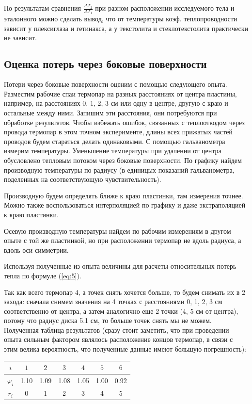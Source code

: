 \documentclass[a4paper,11.5pt]{article} %
\begin{document}
По результатам сравнения $\frac{\Delta T_2}{\Delta T_1}$ при разном расположении исследуемого тела и эталонного можно сделать вывод, что от температуры коэф. теплопроводности зависит у плексиглаза и гетинакса, а у текстолита и стеклотекстолита практически не зависит.

\subsection{Оценка потерь через боковые поверхности}
Потери через боковые поверхности оценим с помощью следующего опыта. Разместим рабочие спаи термопар на разных расстояниях от центра пластины, например, на расстояниях 0, 1, 2, 3 см или одну в центре, другую с краю и остальные между ними. Запишим эти расстояния, они потребуются при обработке результатов. Чтобы избежать ошибок, связанных с теплоотводом через провода термопар в этом точном эксперименте, длины всех прижатых частей проводов будем стараться делать одинаковыми. С помощью гальванометра измерим температуры. Уменьшение температуры при удалении от центра обусловлено тепловым потоком через боковые поверхности. По графику найдем производную температуры по радиусу (в единицых показаний гальванометра, поделенных на соответствующую чувствительность).

Производную будем определять ближе к краю пластинки, там измерения точнее. Можно также воспользоваться интерполяцией по графику и даже экстраполяцией к краю пластинки. 

Осевую производную температуры найдем по рабочим измерениям в другом опыте с той же пластинкой, но при расположении термопар не вдоль радиуса, а вдоль оси симметрии.

Используя полученные из опыта величины для расчеты относительных потерь тепла по формуле (\ref{eq:5}).

Так как всего термопар 4, а точек снять хочется больше, то будем снимать их в 2 захода: сначала снимем значения на 4 точках с расстояниями 0, 1, 2, 3 см соответственно от центра, а затем аналогично еще 2 точки (4, 5 см от центра), потому что радиус диска 5.1 см, то больше точек снять мы не можем. Полученная таблица результатов (сразу стоит заметить, что при проведении опыта сильным фактором являлось расположение концов термопар, в связи с этим велика вероятность, что полученные данные имеют большую погрешность):

\begin{center}
\begin{tabular}{|c|c|c|c|c|c|c|}
\hline
$i$ & $1$ & $2$ & $3$ & $4$ & $5$ & $6$ \\ 
\hline 
$\varphi_i$ & 1.10 & 1.09 & 1.08 & 1.05 & 1.00 & 0.92\\ 
\hline 
$r_i$ & 0 & 1 & 2 & 3 & 4 & 5\\ 
\hline 
\end{tabular} 
\end{center}
\end{document}
